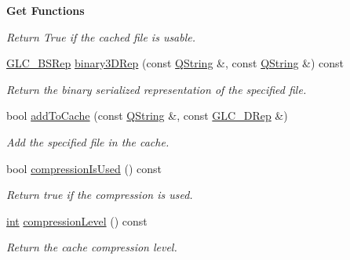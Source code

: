 \begin{Indent}{\bf Get Functions}
\begin{DoxyCompactItemize}
\begin{DoxyCompactList}\small\item\em Return True if the cached file is usable. \end{DoxyCompactList}\item 
\hyperlink{class_g_l_c___b_s_rep}{G\-L\-C\-\_\-\-B\-S\-Rep} \hyperlink{class_g_l_c___cache_manager_ac6c7d034744e6fa5b7a1f134c736e3d2}{binary3\-D\-Rep} (const \hyperlink{group___u_a_v_objects_plugin_gab9d252f49c333c94a72f97ce3105a32d}{Q\-String} \&, const \hyperlink{group___u_a_v_objects_plugin_gab9d252f49c333c94a72f97ce3105a32d}{Q\-String} \&) const 
\begin{DoxyCompactList}\small\item\em Return the binary serialized representation of the specified file. \end{DoxyCompactList}\item 
bool \hyperlink{class_g_l_c___cache_manager_a7d916579f9836d035116572c9f82c250}{add\-To\-Cache} (const \hyperlink{group___u_a_v_objects_plugin_gab9d252f49c333c94a72f97ce3105a32d}{Q\-String} \&, const \hyperlink{class_g_l_c__3_d_rep}{G\-L\-C\-\_\-D\-Rep} \&)
\begin{DoxyCompactList}\small\item\em Add the specified file in the cache. \end{DoxyCompactList}\item 
bool \hyperlink{class_g_l_c___cache_manager_a0c85e0470f98dcc100b62f0f4a1a5eac}{compression\-Is\-Used} () const 
\begin{DoxyCompactList}\small\item\em Return true if the compression is used. \end{DoxyCompactList}\item 
\hyperlink{ioapi_8h_a787fa3cf048117ba7123753c1e74fcd6}{int} \hyperlink{class_g_l_c___cache_manager_ae829f452dbfee6708b8d10dfc7ca71f8}{compression\-Level} () const 
\begin{DoxyCompactList}\small\item\em Return the cache compression level. \end{DoxyCompactList}\end{DoxyCompactItemize}
\end{Indent}

